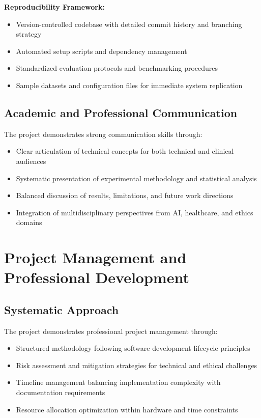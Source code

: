 \textbf{Reproducibility Framework:}
\begin{itemize}
    \item Version-controlled codebase with detailed commit history and branching strategy
    \item Automated setup scripts and dependency management
    \item Standardized evaluation protocols and benchmarking procedures
    \item Sample datasets and configuration files for immediate system replication
\end{itemize}

\subsection{Academic and Professional Communication}
The project demonstrates strong communication skills through:
\begin{itemize}
    \item Clear articulation of technical concepts for both technical and clinical audiences
    \item Systematic presentation of experimental methodology and statistical analysis
    \item Balanced discussion of results, limitations, and future work directions
    \item Integration of multidisciplinary perspectives from AI, healthcare, and ethics domains
\end{itemize}

\section{Project Management and Professional Development}

\subsection{Systematic Approach}
The project demonstrates professional project management through:
\begin{itemize}
    \item Structured methodology following software development lifecycle principles
    \item Risk assessment and mitigation strategies for technical and ethical challenges
    \item Timeline management balancing implementation complexity with documentation requirements
    \item Resource allocation optimization within hardware and time constraints
\end{itemize}

